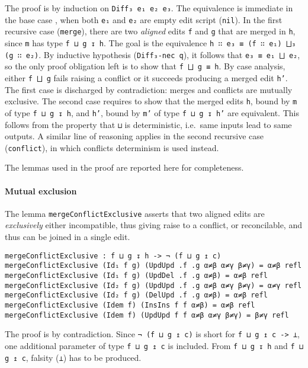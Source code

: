 \documentclass[../Thesis.tex]{subfiles}
\begin{document}
	The proof is by induction on \texttt{Diff₃ e₁ e₂ e₃}.
	The equivalence is immediate in the base case	, when both
	\texttt{e₁} and \texttt{e₂} are empty edit script (\texttt{nil}).
	In the first recursive case (\texttt{merge}), there are 
	two \emph{aligned} edits \texttt{f} and \texttt{g} that are
	merged in \texttt{h}, since \texttt{m} has type \texttt{f ⊔ g ↧ h}.
	The goal is the equivalence \texttt{h ∷ e₃ ≡ (f ∷ e₁) ⨆₃ (g ∷ e₂)}. By inductive 
	hypothesis (\texttt{Diff₃-nec q}), it follows that \texttt{e₃ ≡ e₁ ⨆ e₂}, so
	the only proof obligation left is to show that \texttt{f ⨆ g ≡ h}.
	By case analysis, either \texttt{f ⨆ g} fails raising a conflict or it succeeds
	producing a merged edit \texttt{h'}.
	The first case is discharged by contradiction: merges and conflicts
	are mutually exclusive.
	The second case requires to show that the merged edits \texttt{h},
	bound by \texttt{m} of type \texttt{f ⊔ g ↧ h}, and \texttt{h'}, bound by 
	\texttt{m'} of type \texttt{f ⊔ g ↧ h'} are equivalent.
	This follows from the property that \texttt{⊔} is deterministic, 
	i.e.\ same inputs lead to same outputs.
	A similar line of reasoning applies in the second recursive
	case (\texttt{conflict}), in which conflicts determinism
	is used instead.
	
	The lemmas used in the proof are reported here for completeness.

	\paragraph{Mutual exclusion}
	\label{par:MutualExclusion}
	The lemma \texttt{mergeConflictExclusive} asserts that two aligned edits
	are \emph{exclusively} either incompatible, 
	thus giving raise to a conflict, or 
	reconcilable, and thus can be joined in a single edit. 

\begin{verbatim}
mergeConflictExclusive : f ⊔ g ↧ h -> ¬ (f ⊔ g ↥ c)
mergeConflictExclusive (Id₁ f g) (UpdUpd .f .g α≠β α≠γ β≠γ) = α≠β refl
mergeConflictExclusive (Id₁ f g) (UpdDel .f .g α≠β) = α≠β refl
mergeConflictExclusive (Id₂ f g) (UpdUpd .f .g α≠β α≠γ β≠γ) = α≠γ refl
mergeConflictExclusive (Id₂ f g) (DelUpd .f .g α≠β) = α≠β refl
mergeConflictExclusive (Idem f) (InsIns f f α≠β) = α≠β refl
mergeConflictExclusive (Idem f) (UpdUpd f f α≠β α≠γ β≠γ) = β≠γ refl
	\end{verbatim}
	
	The proof is by contradiction.
	Since \texttt{¬ (f ⊔ g ↥ c)} is short for \texttt{f ⊔ g ↥ c -> ⊥},
	one additional parameter of type \texttt{f ⊔ g ↥ c} is included.
	From \texttt{f ⊔ g ↧ h} and \texttt{f ⊔ g ↥ c}, falsity (\texttt{⊥})
	has to be produced. 
	
\end{document}
